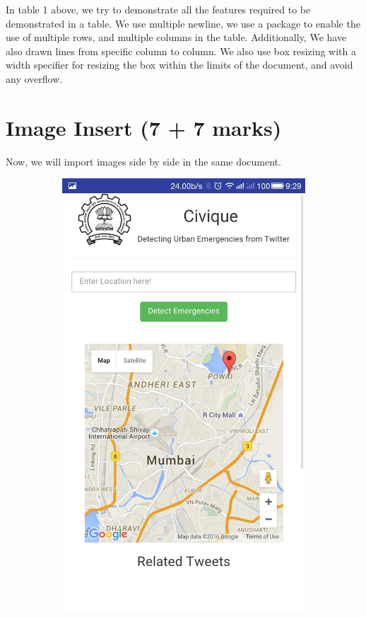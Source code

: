 \documentclass[12pt]{article}
\begin{document}
\begin{Large}
In table 1 above, we try to demonstrate all the features required to be demonstrated in a table. We use
multiple newline, we use a package to enable the use
of multiple rows, and multiple columns in the table.
Additionally, We have also drawn lines from specific
column to column. We also use box resizing with a
width specifier for resizing the box within the limits of
the document, and avoid any overflow.
\end{Large}
\newpage
\section{Image Insert (7 + 7 marks)}
\centerline{Now, we will import images side by side in the same document.}
\begin{figure}[H]
  \centering
  \begin{subfigure}[t]{0.37\textwidth}
    \includegraphics[width=\textwidth]{1}

\end{subfigure}
\end{figure}
\end{document}
